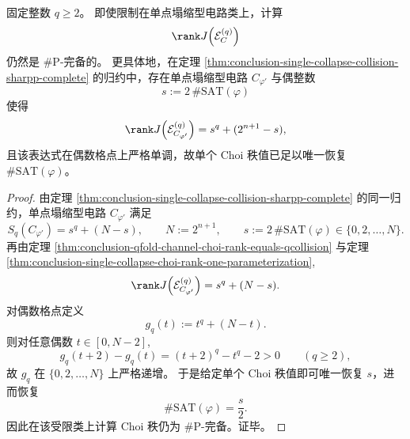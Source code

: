 \begin{theorem}\label{thm:conclusion-single-collapse-choi-rank-sharpp-persists}
固定整数 \(q\ge 2\)。
即使限制在单点塌缩型电路类上，计算
\[
\rank J\!\left(\mathcal E_C^{(q)}\right)
\]
仍然是 \(\#\mathrm P\)-完备的。
更具体地，在定理 \ref{thm:conclusion-single-collapse-collision-sharpp-complete} 的归约中，存在单点塌缩型电路 \(C_{\varphi'}\) 与偶整数
\[
s:=2\,\#\mathrm{SAT}(\varphi)
\]
使得
\[
\rank J\!\left(\mathcal E_{C_{\varphi'}}^{(q)}\right)=s^q+(2^{n+1}-s),
\]
且该表达式在偶数格点上严格单调，故单个 Choi 秩值已足以唯一恢复 \(\#\mathrm{SAT}(\varphi)\)。
\end{theorem}
\begin{proof}
由定理 \ref{thm:conclusion-single-collapse-collision-sharpp-complete} 的同一归约，单点塌缩型电路 \(C_{\varphi'}\) 满足
\[
S_q(C_{\varphi'})=s^q+(N-s),
\qquad
N:=2^{n+1},
\qquad
s:=2\,\#\mathrm{SAT}(\varphi)\in\{0,2,\dots,N\}.
\]
再由定理 \ref{thm:conclusion-qfold-channel-choi-rank-equals-qcollision} 与定理 \ref{thm:conclusion-single-collapse-choi-rank-one-parameterization},
\[
\rank J\!\left(\mathcal E_{C_{\varphi'}}^{(q)}\right)=s^q+(N-s).
\]
对偶数格点定义
\[
g_q(t):=t^q+(N-t).
\]
则对任意偶数 \(t\in[0,N-2]\),
\[
g_q(t+2)-g_q(t)=(t+2)^q-t^q-2>0
\qquad(q\ge2),
\]
故 \(g_q\) 在 \(\{0,2,\dots,N\}\) 上严格递增。
于是给定单个 Choi 秩值即可唯一恢复 \(s\)，进而恢复
\[
\#\mathrm{SAT}(\varphi)=\frac{s}{2}.
\]
因此在该受限类上计算 Choi 秩仍为 \(\#\mathrm P\)-完备。证毕。
\end{proof}

